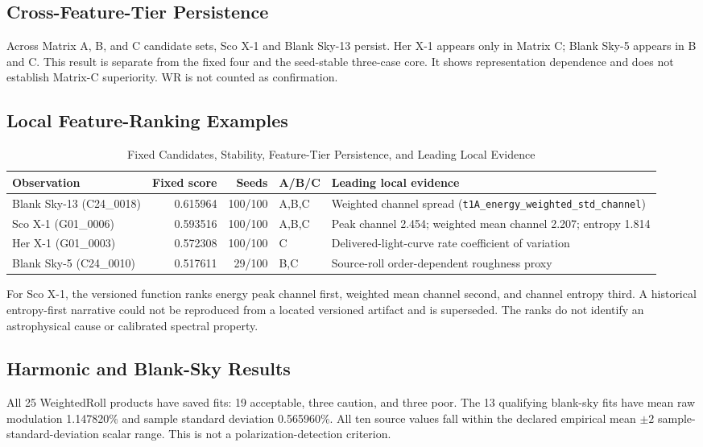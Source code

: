 \documentclass[conference]{IEEEtran}
\begin{document}
\subsection{Cross-Feature-Tier Persistence}
Across Matrix A, B, and C candidate sets, Sco X-1 and Blank Sky-13 persist. Her X-1 appears only in Matrix C; Blank Sky-5 appears in B and C. This result is separate from the fixed four and the seed-stable three-case core. It shows representation dependence and does not establish Matrix-C superiority. WR is not counted as confirmation.

\subsection{Local Feature-Ranking Examples}
\begin{table}[t]
\caption{Fixed Candidates, Stability, Feature-Tier Persistence, and Leading Local Evidence}
\label{tab:candidates}
\centering
\small
\begin{tabular}{lrrlp{6.2cm}}
\toprule
Observation & Fixed score & Seeds & A/B/C & Leading local evidence\\
\midrule
Blank Sky-13 (C24\_0018) & 0.615964 & 100/100 & A,B,C & Weighted channel spread (\texttt{t1A\_energy\_weighted\_std\_channel})\\
Sco X-1 (G01\_0006) & 0.593516 & 100/100 & A,B,C & Peak channel 2.454; weighted mean channel 2.207; entropy 1.814\\
Her X-1 (G01\_0003) & 0.572308 & 100/100 & C & Delivered-light-curve rate coefficient of variation\\
Blank Sky-5 (C24\_0010) & 0.517611 & 29/100 & B,C & Source-roll order-dependent roughness proxy\\
\bottomrule
\end{tabular}
\end{table}

For Sco X-1, the versioned function ranks energy peak channel first, weighted mean channel second, and channel entropy third. A historical entropy-first narrative could not be reproduced from a located versioned artifact and is superseded. The ranks do not identify an astrophysical cause or calibrated spectral property.

\subsection{Harmonic and Blank-Sky Results}
All 25 WeightedRoll products have saved fits: 19 acceptable, three caution, and three poor. The 13 qualifying blank-sky fits have mean raw modulation 1.147820\% and sample standard deviation 0.565960\%. All ten source values fall within the declared empirical mean $\pm2$ sample-standard-deviation scalar range. This is not a polarization-detection criterion.
\end{document}
